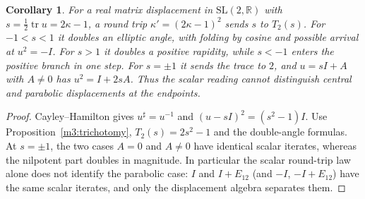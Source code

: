 \documentclass[11pt,reqno]{amsart}
\newtheorem{corollary}[theorem]{Corollary}
\theoremstyle{definition}
\theoremstyle{remark}
\numberwithin{equation}{section}
\newcommand{\R}{\mathbb{R}}
\begin{document}
\begin{corollary}\label{m3:iteration}
For a real matrix displacement in \(\mathrm{SL}(2,\R)\) with
\(s=\tfrac12\operatorname{tr}u=2\kappa-1\), a round trip
\(\kappa'=(2\kappa-1)^2\) sends \(s\) to \(T_2(s)\).
For \(-1<s<1\) it doubles an elliptic angle, with folding by cosine
and possible arrival at \(u^2=-I\). For \(s>1\) it doubles a positive
rapidity, while \(s<-1\) enters the positive branch in one step.
For \(s=\pm1\) it sends the trace to \(2\), and \(u=sI+A\) with
\(A\ne0\) has \(u^2=I+2sA\). Thus the scalar reading cannot
distinguish central and parabolic displacements at the endpoints.
\end{corollary}
\begin{proof}
Cayley--Hamilton gives \(u^\sharp=u^{-1}\) and
\((u-sI)^2=(s^2-1)I\). Use Proposition~\ref{m3:trichotomy},
\(T_2(s)=2s^2-1\) and the double-angle formulas. At \(s=\pm1\),
the two cases \(A=0\) and \(A\ne0\) have identical scalar iterates,
whereas the nilpotent part doubles in magnitude.  In particular the scalar round-trip law alone does not identify the parabolic
case: $I$ and $I+E_{12}$ (and $-I$, $-I+E_{12}$) have the same scalar iterates, and only the displacement algebra separates them.
\end{proof}
\end{document}
